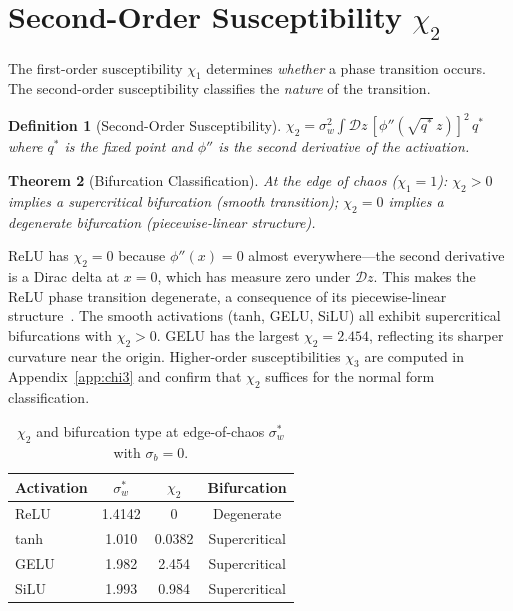 \documentclass[10pt]{article}
\newtheorem{theorem}{Theorem}
\newtheorem{definition}[theorem]{Definition}
\begin{document}
\section{Second-Order Susceptibility $\chi_2$}
\label{sec:chi2}

The first-order susceptibility $\chi_1$ determines \emph{whether} a phase transition occurs.
The second-order susceptibility classifies the \emph{nature} of the transition.

\begin{definition}[Second-Order Susceptibility]
\label{def:chi2}
$\chi_2 = \sigma_w^2 \int \mathcal{D}z\, [\phi''(\sqrt{q^*}\, z)]^2\, q^*$
where $q^*$ is the fixed point and $\phi''$ is the second derivative of the activation.
\end{definition}

\begin{theorem}[Bifurcation Classification]
\label{thm:bifurcation}
At the edge of chaos ($\chi_1 = 1$): $\chi_2 > 0$ implies a supercritical bifurcation (smooth transition); $\chi_2 = 0$ implies a degenerate bifurcation (piecewise-linear structure).
\end{theorem}

ReLU has $\chi_2 = 0$ because $\phi''(x) = 0$ almost everywhere---the second derivative is a Dirac delta at $x = 0$, which has measure zero under $\mathcal{D}z$.
This makes the ReLU phase transition degenerate, a consequence of its piecewise-linear structure~\cite{diBernardo2008piecewise}.
The smooth activations (tanh, GELU, SiLU) all exhibit supercritical bifurcations with $\chi_2 > 0$.
GELU has the largest $\chi_2 = 2.454$, reflecting its sharper curvature near the origin.
Higher-order susceptibilities $\chi_3$ are computed in Appendix~\ref{app:chi3} and confirm that $\chi_2$ suffices for the normal form classification.

\begin{table}[t]
\centering
\caption{$\chi_2$ and bifurcation type at edge-of-chaos $\sigma_w^*$ with $\sigma_b = 0$.}
\label{tab:chi2}
\small
\begin{tabular}{@{}lccc@{}}
\toprule
\textbf{Activation} & $\sigma_w^*$ & $\chi_2$ & \textbf{Bifurcation} \\
\midrule
ReLU  & 1.4142 & 0        & Degenerate \\
tanh  & 1.010  & 0.0382   & Supercritical \\
GELU  & 1.982  & 2.454    & Supercritical \\
SiLU  & 1.993  & 0.984    & Supercritical \\
\bottomrule
\end{tabular}
\end{table}
\end{document}
